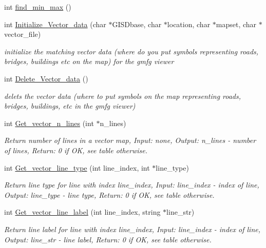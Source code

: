 \begin{CompactItemize}
int \hyperlink{GisApi_8C_a23}{find\_\-min\_\-max} ()
\item 
int \hyperlink{GisApi_8C_a24}{Initialize\_\-Vector\_\-data} (char $\ast$GISDbase, char $\ast$location, char $\ast$mapset, char $\ast$vector\_\-file)
\begin{CompactList}\small\item\em initialize the matching vector data (where do you put symbols representing roads, bridges, buildings etc on the map) for the gmfg viewer \item\end{CompactList}\item 
int \hyperlink{GisApi_8C_a25}{Delete\_\-Vector\_\-data} ()
\begin{CompactList}\small\item\em delets the vector data (where to put symbols on the map representing roads, bridges, buildings, etc in the gmfg viewer) \item\end{CompactList}\item 
int \hyperlink{GisApi_8C_a26}{Get\_\-vector\_\-n\_\-lines} (int $\ast$n\_\-lines)
\begin{CompactList}\small\item\em Return number of lines in a vector map, Input: none, Output: n\_\-lines - number of lines, Return: 0 if OK, see table otherwise. \item\end{CompactList}\item 
int \hyperlink{GisApi_8C_a27}{Get\_\-vector\_\-line\_\-type} (int line\_\-index, int $\ast$line\_\-type)
\begin{CompactList}\small\item\em Return line type for line with index line\_\-index, Input: line\_\-index - index of line, Output: line\_\-type - line type, Return: 0 if OK, see table otherwise. \item\end{CompactList}\item 
int \hyperlink{GisApi_8C_a28}{Get\_\-vector\_\-line\_\-label} (int line\_\-index, string $\ast$line\_\-str)
\begin{CompactList}\small\item\em Return line label for line with index line\_\-index, Input: line\_\-index - index of line, Output: line\_\-str - line label, Return: 0 if OK, see table otherwise. \item\end{CompactList}\item 

\end{CompactItemize}
